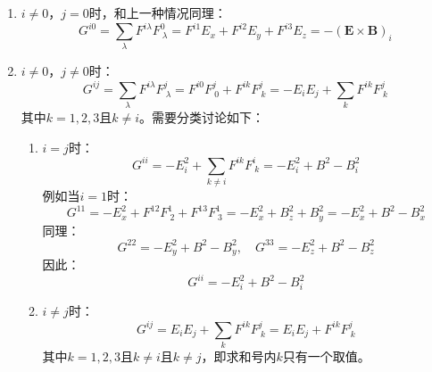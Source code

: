 \documentclass[a4paper]{article}
\begin{document}
\begin{enumerate}
\begin{enumerate}
\[        \]
        例如当$j = 1$时：
        \[
            G^{01} = E_x F^1_{\ 1} + E_y F^1_{\ 2} + E_z F^1_{\ 3} = 0 + E_y B_z - E_z B_y = (\mathbf{E} \times \mathbf{B})_x
        \]
        同理：
        \[
            G^{02} = E_z B_x - E_x B_z = (\mathbf{E} \times \mathbf{B})_y,\quad G^{03} = E_x B_y - E_y B_x = (\mathbf{E} \times \mathbf{B})_z
        \]
        因此：
        \[
            G^{0j} = (\mathbf{E} \times \mathbf{B})_j
        \]
        \item[(3)]
        $i \neq 0$，$j = 0$时，和上一种情况同理：
        \[
            G^{i0} = \sum_\lambda F^{i\lambda} F^0_{\ \lambda} = F^{i1} E_x + F^{i2} E_y + F^{i3} E_z = -(\mathbf{E} \times \mathbf{B})_i
        \]
        \item[(4)]
        $i \neq 0$，$j \neq 0$时：
        \[
            G^{ij} = \sum_\lambda F^{i\lambda} F^j_{\ \lambda} = F^{i0} F^j_{\ 0} + F^{ik} F^j_{\ k} = -E_i E_j + \sum_k F^{ik} F^j_{\ k}
        \]
        其中$k = 1,2,3$且$k \neq i$。需要分类讨论如下：
        \begin{enumerate}
            \item[(a)]
            $i = j$时：
            \[
                G^{ii} = -E_i^2 + \sum_{k \neq i} F^{ik} F^i_{\ k} = -E_i^2 + B^2 - B_i^2
            \]
            例如当$i = 1$时：
            \[
                G^{11} = -E_x^2 + F^{12} F^1_{\ 2} + F^{13} F^1_{\ 3} = -E_x^2 + B_z^2 + B_y^2 = -E_x^2 + B^2 - B_x^2
            \]
            同理：
            \[
                G^{22} = -E_y^2 + B^2 - B_y^2,\quad G^{33} = -E_z^2 + B^2 - B_z^2
            \]
            因此：
            \[
                G^{ii} = -E_i^2 + B^2 - B_i^2
            \]
            \item[(b)]
            $i \neq j$时：
            \[
                G^{ij} = E_i E_j + \sum_k F^{ik} F^j_{\ k} = E_i E_j + F^{ik} F^j_{\ k}
            \]
            其中$k = 1,2,3$且$k \neq i$且$k \neq j$，即求和号内$k$只有一个取值。


\end{enumerate}
\end{enumerate}
\end{enumerate}
\end{document}
